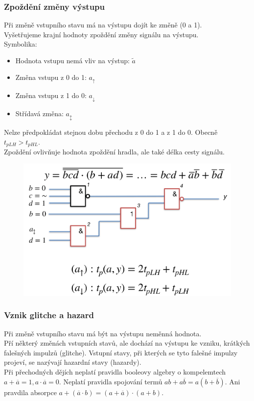 \subsubsection{Zpoždění změny výstupu}
Při změně vstupního stavu má na výstupu dojít ke změně (0 a 1).\\
Vyšetřujeme krajní hodnoty zpoždění změny signálu na výstupu.\\
Symbolika:
\begin{itemize}
    \item Hodnota vstupu nemá vliv na výstup: \(\widetilde{a}\)
    \item Změna vstupu z 0 do 1: \(a_{\uparrow}\)
    \item Změna vstupu z 1 do 0: \(a_{\downarrow}\)
    \item Střídavá změna: \(a_{\updownarrow}\)
\end{itemize}
Nelze předpokládat stejnou dobu přechodu z 0 do 1 a z 1 do 0. Obecně \(t_{pLH} > t_{pHL}\).\\
Zpoždění ovlivňuje hodnota zpoždění hradla, ale také délka cesty signálu. \\
\begin{figure}[h!]
    \centering
    \includegraphics[scale = 0.3]{img/PrechDej.png}
\end{figure}

\subsubsection{Vznik glitche a hazard}
Při změně vstupního stavu má být na výstupu neměnná hodnota.\\
Pří některý změnách vstupních stavů, ale dochází na výstupu ke vzniku, krátkých falešných impulzů (glitche). Vstupní stavy, při kterých se tyto falešné impulzy projeví, se nazývají hazardní stavy (hazardy).\\
Při přechodných dějích neplatí pravidla booleovy algebry o kompelemtech \(a + \overline{a} = 1, a\cdot \overline{a} = 0\). Neplatí pravidla spojování termů \(ab + a\overline{b} = a(b + \overline{b})\). Ani pravdila absorpce \(a + (\overline{a} \cdot b)= (a + \overline{a})\cdot (a + b)\).\\

